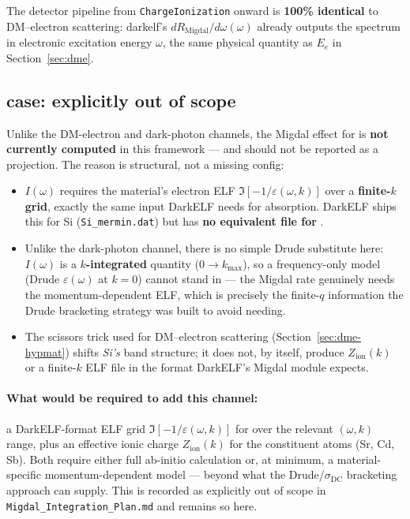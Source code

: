 The detector pipeline from \texttt{ChargeIonization} onward is
\textbf{100\% identical} to DM--electron scattering: darkelf's
$dR_\mathrm{Migdal}/d\omega(\omega)$ already outputs the spectrum in
electronic excitation energy $\omega$, the same physical quantity as $E_e$
in Section~\ref{sec:dme}.

\subsection{\SrCdSb{} case: explicitly out of scope}

Unlike the DM-electron and dark-photon channels, the Migdal effect for
\SrCdSb{} is \textbf{not currently computed} in this framework — and should
not be reported as a projection. The reason is structural, not a missing
config:
\begin{itemize}[leftmargin=*]
  \item $I(\omega)$ requires the material's electron ELF
  $\Im[-1/\varepsilon(\omega,k)]$ over a \textbf{finite-$k$ grid}, exactly
  the same input DarkELF needs for absorption. DarkELF ships this for Si
  (\texttt{Si\_mermin.dat}) but has \textbf{no equivalent file for \SrCdSb{}}.
  \item Unlike the dark-photon channel, there is no simple Drude substitute
  here: $I(\omega)$ is a \textbf{$k$-integrated} quantity ($0\to k_\mathrm{max}$),
  so a frequency-only model (Drude $\varepsilon(\omega)$ at $k=0$) cannot
  stand in — the Migdal rate genuinely needs the momentum-dependent ELF,
  which is precisely the finite-$q$ information the Drude bracketing
  strategy was built to avoid needing.
  \item The scissors trick used for DM--electron scattering
  (Section~\ref{sec:dme-hypmat}) shifts \emph{Si's} band structure; it does
  not, by itself, produce $Z_\mathrm{ion}(k)$ or a finite-$k$ ELF file in the
  format DarkELF's Migdal module expects.
\end{itemize}

\paragraph{What would be required to add this channel:} a DarkELF-format
ELF grid $\Im[-1/\varepsilon(\omega,k)]$ for \SrCdSb{} over the relevant
$(\omega,k)$ range, plus an effective ionic charge $Z_\mathrm{ion}(k)$ for
the constituent atoms (Sr, Cd, Sb). Both require either full ab-initio
calculation or, at minimum, a material-specific momentum-dependent model —
beyond what the Drude/$\sigma_\mathrm{DC}$ bracketing approach can supply.
This is recorded as explicitly out of scope in
\texttt{Migdal\_Integration\_Plan.md} and remains so here.
